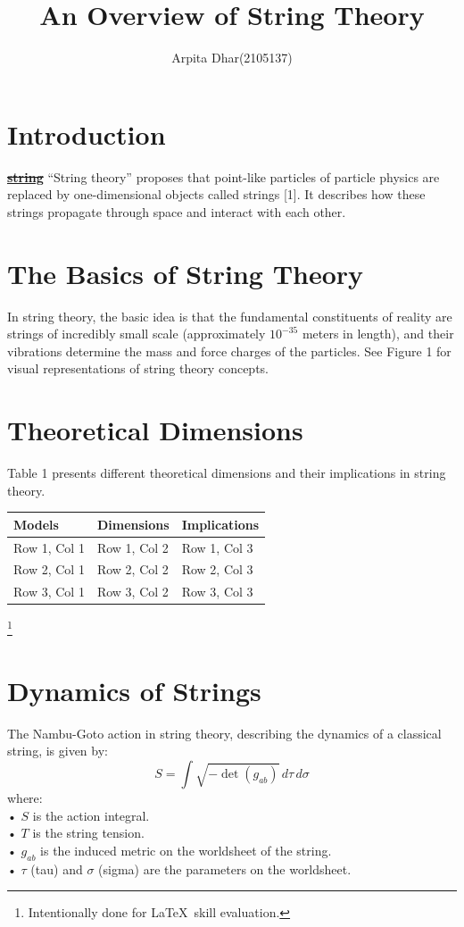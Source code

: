 \documentclass{article}
\title{An Overview of String Theory}
\author{Arpita Dhar(2105137)}
\begin{document}
\maketitle

\section{Introduction}
\st{\underline{\textbf{string}}} “String theory” proposes that point-like particles of particle physics are
replaced by one-dimensional objects called strings [1]. It describes how these
strings propagate through space and interact with each other.

\section{The Basics of String Theory}

In string theory, the basic idea is that the fundamental constituents of reality
are strings of incredibly small scale (approximately $10^{-35}$ meters in length), 
and their vibrations determine the mass and force charges of the particles. See
Figure 1 for visual representations of string theory concepts.

\section{Theoretical Dimensions}
Table 1 presents different theoretical dimensions and their implications in string
theory.
\begin{center}
\caption{Table 1: Various String Theory Models}
\begin{tabular}{ |p{10em}| p{7em}| p{14em}|}
  \hline
  Models & Dimensions & Implications \\
  \hline
  Row 1, Col 1 & Row 1, Col 2 & Row 1, Col 3 \\
  \hline
  Row 2, Col 1 & Row 2, Col 2 & Row 2, Col 3 \\
  \hline
  Row 3, Col 1 & Row 3, Col 2 & Row 3, Col 3 \\
  \hline
\end{tabular}
\end{center}

\footnote{Intentionally done for \LaTeX\ skill evaluation.}

\pagebreak

\section{Dynamics of Strings}
The Nambu-Goto action in string theory, describing the dynamics of a classical
string, is given by: \\
\[
S = \int  \sqrt{-\det(g_{ab})} \, d\tau \, d\sigma
\]
where: \\
• \( S \) is the action integral.\\
• \( T \) is the string tension.\\
• \( g_{ab} \) is the induced metric on the worldsheet of the string.\\
• \( \tau \) (tau) and \( \sigma \) (sigma) are the parameters on the worldsheet.\\
\end{document}
